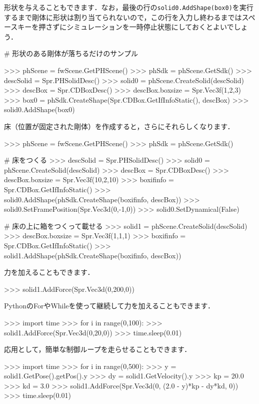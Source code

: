 \KLUDGE 形状を与えることもできます．なお，最後の行の\texttt{solid0.AddShape(box0)}\KLUDGE を実行するまで剛体に形状は割り当てられないので，この行を入力し終わるまではスペースキーを押さずにシミュレーションを一時停止状態にしておくとよいでしょう．
\begin{sourcecode}
# 形状のある剛体が落ちるだけのサンプル

>>> phScene = fwScene.GetPHScene()
>>> phSdk   = phScene.GetSdk()
>>> descSolid = Spr.PHSolidDesc()
>>> solid0 = phScene.CreateSolid(descSolid)
>>> descBox = Spr.CDBoxDesc()
>>> descBox.boxsize = Spr.Vec3f(1,2,3)
>>> box0 = phSdk.CreateShape(Spr.CDBox.GetIfInfoStatic(), descBox)
>>> solid0.AddShape(box0)
\end{sourcecode}

\KLUDGE 床（位置が固定された剛体）を作成すると，さらにそれらしくなります．
\begin{sourcecode}
>>> phScene = fwScene.GetPHScene()
>>> phSdk   = phScene.GetSdk()

# 床をつくる
>>> descSolid = Spr.PHSolidDesc()
>>> solid0 = phScene.CreateSolid(descSolid)
>>> descBox = Spr.CDBoxDesc()
>>> descBox.boxsize = Spr.Vec3f(10,2,10)
>>> boxifinfo = Spr.CDBox.GetIfInfoStatic()
>>> solid0.AddShape(phSdk.CreateShape(boxifinfo, descBox))
>>> solid0.SetFramePosition(Spr.Vec3d(0,-1,0))
>>> solid0.SetDynamical(False)

# 床の上に箱をつくって載せる
>>> solid1 = phScene.CreateSolid(descSolid)
>>> descBox.boxsize = Spr.Vec3f(1,1,1)
>>> boxifinfo = Spr.CDBox.GetIfInfoStatic()
>>> solid1.AddShape(phSdk.CreateShape(boxifinfo, descBox))
\end{sourcecode}

\KLUDGE 力を加えることもできます．
\begin{sourcecode}
>>> solid1.AddForce(Spr.Vec3d(0,200,0))
\end{sourcecode}

Python\KLUDGE のFor\KLUDGE やWhile\KLUDGE を使って継続して力を加えることもできます．
\begin{sourcecode}
>>> import time
>>> for i in range(0,100):
>>>     solid1.AddForce(Spr.Vec3d(0,20,0))
>>>     time.sleep(0.01)
\end{sourcecode}

\KLUDGE 応用として，簡単な制御ループを走らせることもできます．
\begin{sourcecode}
>>> import time
>>> for i in range(0,500):
>>>   y  = solid1.GetPose().getPos().y
>>>   dy = solid1.GetVelocity().y
>>>   kp = 20.0
>>>   kd =  3.0
>>>   solid1.AddForce(Spr.Vec3d(0, (2.0 - y)*kp - dy*kd, 0))
>>>   time.sleep(0.01)
\end{sourcecode}

